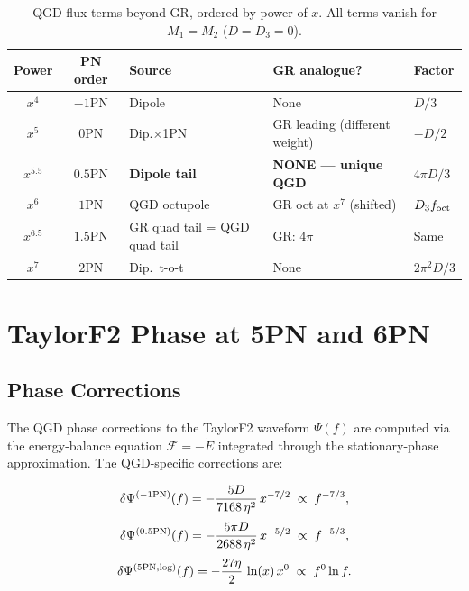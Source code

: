 \documentclass[11pt,a4paper]{article}
\theoremstyle{definition}
\theoremstyle{remark}
\begin{document}
	\begin{table}[ht]
		\centering
		\caption{QGD flux terms beyond GR, ordered by power of $x$.
			All terms vanish for $M_1=M_2$ ($D=D_3=0$).}
		\label{tab:qgd_terms}
		\renewcommand{\arraystretch}{1.4}
		\begin{tabular}{cclll}
			\toprule
			Power & PN order & Source & GR analogue? & Factor \\
			\midrule
			$x^4$   & $-1$PN & Dipole           & None           & $D/3$ \\
			$x^5$   & $ 0$PN & Dip.$\times$1PN  & GR leading (different weight) & $-D/2$ \\
			$x^{5.5}$ & $0.5$PN & \textbf{Dipole tail} & \textbf{NONE — unique QGD} & $4\pi D/3$ \\
			$x^6$   & $ 1$PN & QGD octupole     & GR oct at $x^7$ (shifted)    & $D_3 f_{\rm oct}$ \\
			$x^{6.5}$ & $1.5$PN & GR quad tail = QGD quad tail & GR: $4\pi$ & Same \\
			$x^7$   & $ 2$PN & Dip.\ t-o-t      & None           & $2\pi^2 D/3$ \\
			\bottomrule
		\end{tabular}
	\end{table}
	
	\section{TaylorF2 Phase at 5PN and 6PN}
	\label{sec:phase}
	
	\subsection{Phase Corrections}
	
	The QGD phase corrections to the TaylorF2 waveform $\Psi(f)$ are
	computed via the energy-balance equation
	$\mathcal{F}=-\dot{E}$ integrated through the stationary-phase
	approximation.  The QGD-specific corrections are:
	
	\begin{equation}
		\delta\Psi^{(-1{\rm PN})}(f)
		= -\frac{5D}{7168\,\eta^2}\,x^{-7/2}
		\;\propto\; f^{-7/3},
		\label{eq:phase_m1pn}
	\end{equation}
	\begin{equation}
		\delta\Psi^{(0.5{\rm PN})}(f)
		= -\frac{5\pi D}{2688\,\eta^2}\,x^{-5/2}
		\;\propto\; f^{-5/3},
		\label{eq:phase_05pn}
	\end{equation}
	\begin{equation}
		\delta\Psi^{(5{\rm PN,log})}(f)
		= -\frac{27\eta}{2}\,\ln(x)\,x^{0}
		\;\propto\; f^0\ln f.
		\label{eq:phase_5pn}
	\end{equation}
	
\end{document}
